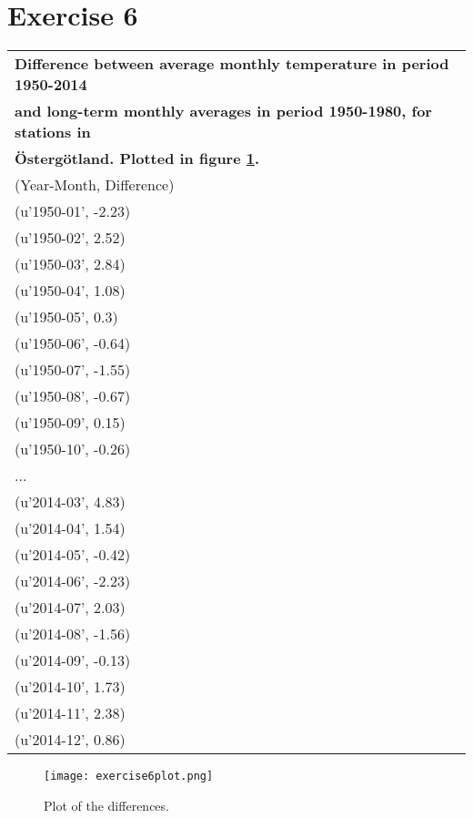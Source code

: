 \documentclass[a4paper,titlepage,12pt]{article}
\begin{document}
\section{Exercise 6}
\begin{tabular}{l}
  \bf Difference between average monthly temperature in period 1950-2014 \\
  \bf and long-term monthly averages in period 1950-1980, for stations in \\
  \bf Östergötland. Plotted in figure \ref{diffplot}. \\ 
(Year-Month, Difference) \\
\hline
  (u'1950-01', -2.23) \\ 
  (u'1950-02', 2.52)  \\ 
  (u'1950-03', 2.84)  \\
  (u'1950-04', 1.08)  \\
  (u'1950-05', 0.3)   \\
  (u'1950-06', -0.64) \\
  (u'1950-07', -1.55) \\
  (u'1950-08', -0.67) \\
  (u'1950-09', 0.15)  \\
  (u'1950-10', -0.26) \\
  ... \\
  (u'2014-03', 4.83)  \\
  (u'2014-04', 1.54)  \\
  (u'2014-05', -0.42) \\
  (u'2014-06', -2.23) \\
  (u'2014-07', 2.03)  \\
  (u'2014-08', -1.56) \\
  (u'2014-09', -0.13) \\
  (u'2014-10', 1.73)  \\
  (u'2014-11', 2.38)  \\
  (u'2014-12', 0.86)  \\
\end{tabular}

\begin{figure}[H]
  \texttt{[image: exercise6plot.png]}
  \caption{Plot of the differences.}
  \label{diffplot}
\end{figure}
\end{document}
